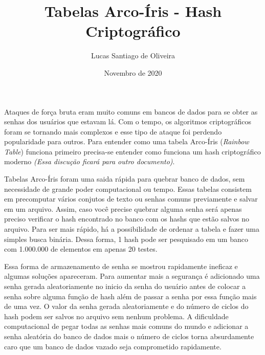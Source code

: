 \documentclass[12pt]{article}
\title{Tabelas Arco-Íris - Hash Criptográfico}
\author{Lucas Santiago de Oliveira}
\date{Novembro de 2020}
\begin{document}
\maketitle

\hspace*{4pt} Ataques de força bruta eram muito comuns em bancos de dados para se obter as senhas dos usuários que estavam lá.
Com o tempo, os algoritmos criptográficos foram se tornando mais complexos e esse tipo de ataque foi perdendo popularidade para outros.
Para entender como uma tabela Arco-Íris (\emph{Rainbow Table}) funciona primeiro precisa-se entender como funciona um hash criptográfico moderno
\emph{(Essa discução ficará para outro documento)}.

Tabelas Arco-Íris foram uma saida rápida para quebrar banco de dados, sem necessidade de grande poder computacional ou tempo. Essas tabelas consistem 
em precomputar vários conjutos de texto ou senhas comuns previamente e salvar em um arquivo. Assim, caso você precise quebrar alguma senha será apenas
preciso verificar o hash encontrado no banco com os hashs que estão salvos no arquivo. Para ser mais rápido, há a possibilidade de ordenar a tabela e
fazer uma simples busca binária. Dessa forma, 1 hash pode ser pesquisado em um banco com 1.000.000 de elementos em apenas 20 testes.

Essa forma de armazenamento de senha se mostrou rapidamente ineficaz e algumas soluções apareceram.
Para aumentar mais a segurança é adicionado uma senha gerada aleatoriamente no inicio da senha do usuário antes de colocar a senha sobre alguma função de hash além de passar
a senha por essa função mais de uma vez. O valor da senha gerada aleatoriamente e do número de ciclos do hash podem ser salvos no arquivo sem nenhum problema.
A dificuldade computacional de pegar todas as senhas mais comuns do mundo e adicionar a senha aleatória do banco de dados mais o número de ciclos torna absurdamente caro
que um banco de dados vazado seja comprometido rapidamente.
\end{document}
